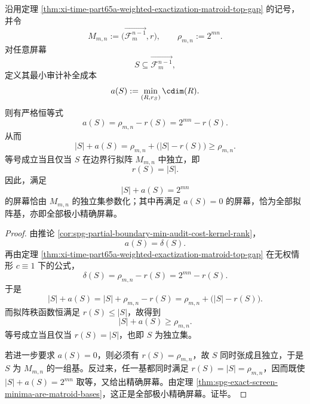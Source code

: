 \begin{theorem}[可见屏幕与外置审计的精确守恒律]\label{thm:conclusion-screen-visible-external-audit-conservation}
沿用定理 \ref{thm:xi-time-part65a-weighted-exactization-matroid-top-gap} 的记号，并令
\[
M_{m,n}:=\bigl(\overrightarrow{\mathcal F_m^{n-1}},r\bigr),
\qquad
\rho_{m,n}:=2^{mn}.
\]
对任意屏幕
\[
S\subseteq \overrightarrow{\mathcal F_m^{n-1}},
\]
定义其最小审计补全成本
\[
a(S):=\min_{(R,r_S)}\cdim(R).
\]
则有严格恒等式
\[
a(S)=\rho_{m,n}-r(S)=2^{mn}-r(S).
\]
从而
\[
|S|+a(S)=\rho_{m,n}+\bigl(|S|-r(S)\bigr)\ge \rho_{m,n}.
\]
等号成立当且仅当 \(S\) 在边界行拟阵 \(M_{m,n}\) 中独立，即
\[
r(S)=|S|.
\]
因此，满足
\[
|S|+a(S)=2^{mn}
\]
的屏幕恰由 \(M_{m,n}\) 的独立集参数化；其中再满足 \(a(S)=0\) 的屏幕，恰为全部拟阵基，亦即全部极小精确屏幕。
\end{theorem}
\begin{proof}
由推论 \ref{cor:spg-partial-boundary-min-audit-cost-kernel-rank}，
\[
a(S)=\delta(S).
\]
再由定理 \ref{thm:xi-time-part65a-weighted-exactization-matroid-top-gap} 在无权情形 \(c\equiv 1\) 下的公式，
\[
\delta(S)=\rho_{m,n}-r(S)=2^{mn}-r(S).
\]
于是
\[
|S|+a(S)=|S|+\rho_{m,n}-r(S)=\rho_{m,n}+\bigl(|S|-r(S)\bigr).
\]
而拟阵秩函数恒满足 \(r(S)\le |S|\)，故得到
\[
|S|+a(S)\ge \rho_{m,n}.
\]
等号成立当且仅当 \(r(S)=|S|\)，也即 \(S\) 为独立集。

若进一步要求 \(a(S)=0\)，则必须有 \(r(S)=\rho_{m,n}\)，故 \(S\) 同时张成且独立，于是 \(S\) 为 \(M_{m,n}\) 的一组基。反过来，任一基都同时满足 \(r(S)=|S|=\rho_{m,n}\)，因而既使 \(|S|+a(S)=2^{mn}\) 取等，又给出精确屏幕。由定理 \ref{thm:spg-exact-screen-minima-are-matroid-bases}，这正是全部极小精确屏幕。证毕。
\end{proof}

